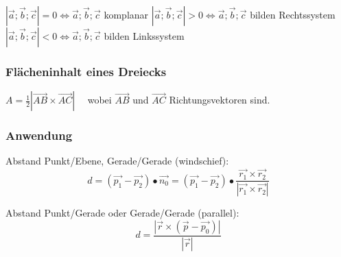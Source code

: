 		$|\vec{a}; \vec{b}; \vec{c}| = 0 \Leftrightarrow \vec{a}; \vec{b}; \vec{c}$ komplanar \qquad 
		$|\vec{a}; \vec{b}; \vec{c}| > 0 \Leftrightarrow \vec{a}; \vec{b}; \vec{c}$ bilden Rechtssystem \qquad
		$|\vec{a}; \vec{b}; \vec{c}| < 0 \Leftrightarrow \vec{a}; \vec{b}; \vec{c}$ bilden Linkssystem

	\subsubsection{Flächeninhalt eines Dreiecks}
		$A=\frac{1}{2}|\vec{AB}\times\vec{AC}|$ \ \ wobei $\vec{AB}$ und $\vec{AC}$ Richtungsvektoren sind.
	
	\subsubsection{Anwendung}
		Abstand Punkt/Ebene, Gerade/Gerade (windschief):
		\begin{equation*}
			d = (\vec{p_1} - \vec{p_2}) \bullet \vec{n_0} = (\vec{p_1} - \vec{p_2}) \bullet \frac{\vec{r_1} \times \vec{r_2}}{|\vec{r_1} \times \vec{r_2}|}
		\end{equation*} 

		Abstand Punkt/Gerade oder Gerade/Gerade (parallel):
		\begin{equation*}
			d = \frac{|\vec{r} \times (\vec{p} - \vec{p_0})|}{|\vec{r}|}
		\end{equation*}